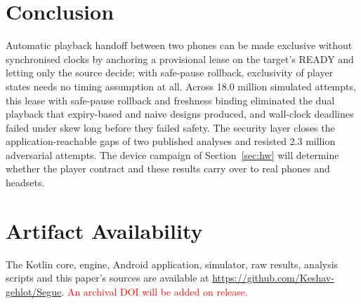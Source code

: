 \documentclass[conference]{IEEEtran}
\newcommand{\draftnote}[1]{\textcolor{red}{#1}}
\begin{document}
\section{Conclusion}

Automatic playback handoff between two phones can be made exclusive without synchronised clocks by anchoring a provisional lease on the target's READY and letting only the source decide; with safe-pause rollback, exclusivity of player states needs no timing assumption at all. Across 18.0 million simulated attempts, this lease with safe-pause rollback and freshness binding eliminated the dual playback that expiry-based and naive designs produced, and wall-clock deadlines failed under skew long before they failed safety. The security layer closes the application-reachable gaps of two published analyses and resisted 2.3 million adversarial attempts. The device campaign of Section~\ref{sec:hw} will determine whether the player contract and these results carry over to real phones and headsets.

\section*{Artifact Availability}
The Kotlin core, engine, Android application, simulator, raw results, analysis scripts and this paper's sources are available at \url{https://github.com/Keshav-gehlot/Segue}. \draftnote{An archival DOI will be added on release.}
\end{document}

